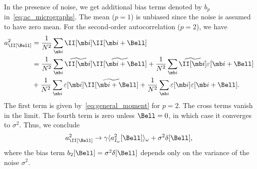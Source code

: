 \documentclass[9pt,twocolumn,twoside,lineno]{pnas-new}
\begin{document}
In the presence of noise, we get additional bias terms denoted by $b_p$ in~\eqref{eq:ac_micrographs}. The mean ($p=1$) is unbiased  since the noise is assumed to have zero mean. For the second-order autocorrelation ($p=2$), we have
\[\begin{aligned} 
a^2_\II[\Bell] &=
\frac{1}{N^2}\sum_{\mb i }\II[\mb i]\II[\mb
i+\Bell]\\
&= \frac{1}{N^2}\sum_{\mb i }\widetilde\II[\mb i]\widetilde\II[\mb i+\Bell] + \frac{1}{N^2}\sum_{\mb i }\widetilde\II[\mb i]\varepsilon[\mb i + \Bell]\\ &+ \frac{1}{N^2}\sum_{\mb i }\varepsilon[\mb i]\widetilde\II[\mb i + \Bell] + \frac{1}{N^2}\sum_{\mb i }\varepsilon[\mb i]\varepsilon[\mb i + \Bell]. 
\end{aligned}\]
The first term is given by~\eqref{eq:general_moment} for $p=2$. 
The cross terms vanish in the limit.  
The fourth term is zero unless $\Bell=0$, in which case it converges to $\sigma^2$.
Thus, we conclude
\begin{equation} \label{eq:second_order_ac_volume_data}
a^2_\II[\Bell] \to \gamma\langle a^2_{I_{\omega}}[\Bell]\rangle_{\omega} + \sigma^2\delta[\Bell],
\end{equation}
where the  bias term $b_2[\Bell] = \sigma^2\delta[\Bell]$   depends only on the variance of the noise $\sigma^2$.
\end{document}
